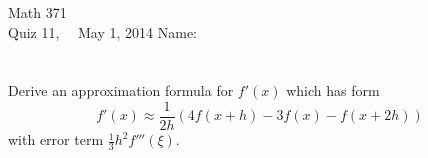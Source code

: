 \documentclass[addpoints, 11pt]{exam}
\begin{document}
Math 371 \\
Quiz 11, \ \ May 1, 2014
\hspace{2.in}
{Name:} {\underline {\hspace{2.15in}}} \\ \normalsize
\ \\ \ \\

Derive an approximation formula for $f'(x)$ which has form
$$
f'(x) \approx \frac{1}{2h} \left ( 4f(x+h) - 3f(x) - f(x+2h) \right)
$$
with error term $ \frac{1}{3} h^2 f'''(\xi)$.
\end{document}
